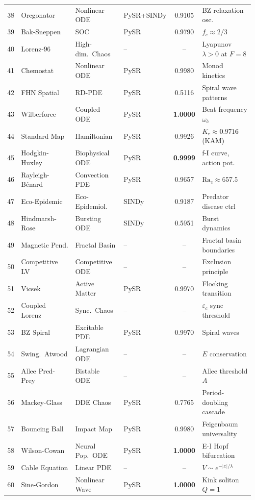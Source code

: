 \begin{table}[t]
\begin{tabular}{rlllcl}
38 & Oregonator & Nonlinear ODE & PySR+SINDy & 0.9105 & BZ relaxation osc. \\
39 & Bak-Sneppen & SOC & PySR & 0.9790 & $f_c \approx 2/3$ \\
40 & Lorenz-96 & High-dim.\ Chaos & -- & -- & Lyapunov $\lambda > 0$ at $F{=}8$ \\
41 & Chemostat & Nonlinear ODE & PySR & 0.9980 & Monod kinetics \\
42 & FHN Spatial & RD-PDE & PySR & 0.5116 & Spiral wave patterns \\
43 & Wilberforce & Coupled ODE & PySR & \textbf{1.0000} & Beat frequency $\omega_b$ \\
44 & Standard Map & Hamiltonian & PySR & 0.9926 & $K_c \approx 0.9716$ (KAM) \\
45 & Hodgkin-Huxley & Biophysical ODE & PySR & \textbf{0.9999} & f-I curve, action pot. \\
46 & Rayleigh-B\'enard & Convection PDE & PySR & 0.9657 & $\text{Ra}_c \approx 657.5$ \\
47 & Eco-Epidemic & Eco-Epidemiol. & SINDy & 0.9187 & Predator disease ctrl \\
48 & Hindmarsh-Rose & Bursting ODE & SINDy & 0.5951 & Burst dynamics \\
49 & Magnetic Pend. & Fractal Basin & -- & -- & Fractal basin boundaries \\
50 & Competitive LV & Competitive ODE & -- & -- & Exclusion principle \\
51 & Vicsek & Active Matter & PySR & 0.9970 & Flocking transition \\
52 & Coupled Lorenz & Sync.\ Chaos & -- & -- & $\varepsilon_c$ sync threshold \\
53 & BZ Spiral & Excitable PDE & PySR & 0.9970 & Spiral waves \\
54 & Swing.\ Atwood & Lagrangian ODE & -- & -- & $E$ conservation \\
55 & Allee Pred-Prey & Bistable ODE & -- & -- & Allee threshold $A$ \\
56 & Mackey-Glass & DDE Chaos & PySR & 0.7765 & Period-doubling cascade \\
57 & Bouncing Ball & Impact Map & PySR & 0.9980 & Feigenbaum universality \\
58 & Wilson-Cowan & Neural Pop.\ ODE & PySR & \textbf{1.0000} & E-I Hopf bifurcation \\
59 & Cable Equation & Linear PDE & -- & -- & $V \sim e^{-|x|/\lambda}$ \\
60 & Sine-Gordon & Nonlinear Wave & PySR & \textbf{1.0000} & Kink soliton $Q=1$ \\

\end{tabular}
\end{table}
